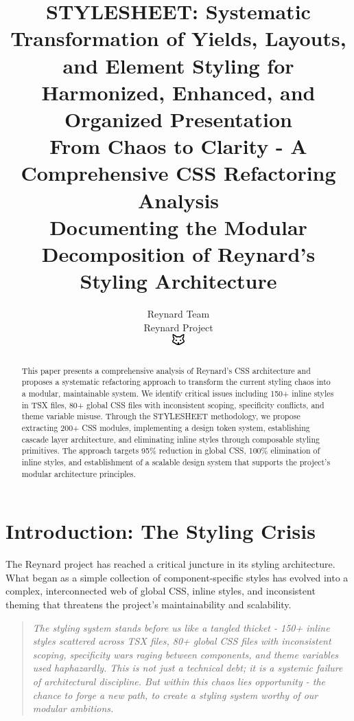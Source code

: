 \documentclass[11pt]{article}
\begin{document}
\title{\textbf{STYLESHEET: Systematic Transformation of Yields, Layouts, and Element Styling for Harmonized, Enhanced, and Organized Presentation} \\
\Large{From Chaos to Clarity - A Comprehensive CSS Refactoring Analysis} \\
\large{Documenting the Modular Decomposition of Reynard's Styling Architecture}}

\author{Reynard Team\\
Reynard Project\\
\includegraphics[width=0.5cm]{../../shared-assets/favicon.pdf}}

\maketitle

\begin{abstract}
This paper presents a comprehensive analysis of Reynard's CSS architecture and proposes a systematic refactoring approach to transform the current styling chaos into a modular, maintainable system. We identify critical issues including 150+ inline styles in TSX files, 80+ global CSS files with inconsistent scoping, specificity conflicts, and theme variable misuse. Through the STYLESHEET methodology, we propose extracting 200+ CSS modules, implementing a design token system, establishing cascade layer architecture, and eliminating inline styles through composable styling primitives. The approach targets 95\% reduction in global CSS, 100\% elimination of inline styles, and establishment of a scalable design system that supports the project's modular architecture principles.
\end{abstract}

\tableofcontents
\newpage

\section{Introduction: The Styling Crisis}

The Reynard project has reached a critical juncture in its styling architecture. What began as a simple collection of component-specific styles has evolved into a complex, interconnected web of global CSS, inline styles, and inconsistent theming that threatens the project's maintainability and scalability.

\begin{quote}
\emph{The styling system stands before us like a tangled thicket - 150+ inline styles scattered across TSX files, 80+ global CSS files with inconsistent scoping, specificity wars raging between components, and theme variables used haphazardly. This is not just a technical debt; it is a systemic failure of architectural discipline. But within this chaos lies opportunity - the chance to forge a new path, to create a styling system worthy of our modular ambitions.}
\end{quote}
\end{document}
